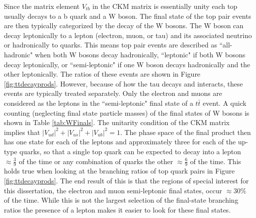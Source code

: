 Since the matrix element $V_{tb}$ in the CKM matrix is essentially unity each top usually decays to a b quark and a W boson.  The final state of the top pair events are then typically categorized by the decay of the W bosons.  The W boson can decay leptonically to a lepton (electron, muon, or tau) and its associated neutrino or hadronically to quarks.  This means top pair events are described as ``all-hadronic" when both W bosons decay hadronically, ``leptonic" if both W bosons decay leptonically, or ``semi-leptonic" if one W boson decays hadronically and the other leptonically.  The ratios of these events are shown in Figure \ref{fig:ttdecayprods}.  However, because of how the tau decays and interacts, these events are typically treated separately.  Only the electron and muons are considered as the leptons in the ``semi-leptonic" final state of a $t\bar{t}$ event.  A quick counting (neglecting final state particle masses) of the final states of W bosons  is shown in Table \ref{tab:WFinals}.  The unitarity condition of the CKM matrix implies that $|V_{ud}|^2 + |V_{us}|^2 + |V_{ub}|^2 =1$.  The phase space of the final product then has one state for each of the leptons and approximately three for each of the up-type quarks, so that a single top quark can be expected to decay into a lepton $\approx \frac{3}{9}$ of the time or any combination of quarks the other $\approx \frac{6}{9}$ of the time.  This holds true when looking at the branching ratios of top quark pairs in Figure \ref{fig:ttdecayprods}.  The end result of this is that the regions of special interest for this dissertation, the electron and muon semi-leptonic final states, occur $\approx 30\%$ of the time.  While this is not the largest selection of the final-state branching ratios the presence of a lepton makes it easier to look for these final states.

